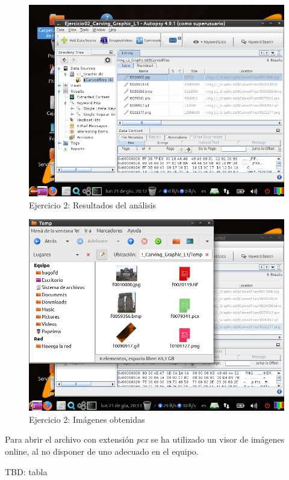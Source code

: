 \documentclass[11pt]{article}
\begin{document}
\begin{figure}[H]
  \caption{Ejercicio 2: Resultados del análisis}
  \centering
  \includegraphics[scale=0.7]{e2-5.png}
\end{figure}

\begin{figure}[H]
  \caption{Ejercicio 2: Imágenes obtenidas}
  \centering
  \includegraphics[scale=0.7]{e2-6.png}
\end{figure}

Para abrir el archivo con extensión \textit{pcx} se ha utilizado un visor de imágenes online, al no disponer de uno adecuado en el equipo.

TBD: tabla

\end{document}
